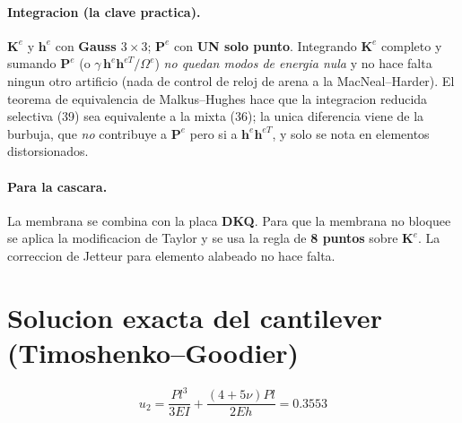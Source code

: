 \documentclass[11pt]{article}
\begin{document}
\paragraph{Integracion (la clave practica).}
$\mathbf K^{e}$ y $\mathbf h^{e}$ con \textbf{Gauss $3\times3$}; $\mathbf P^{e}$ con
\textbf{UN solo punto}. Integrando $\mathbf K^{e}$ completo y sumando $\mathbf P^{e}$
(o $\gamma\,\mathbf h^{e}\mathbf h^{eT}/\Omega^{e}$) \emph{no quedan modos de energia nula}
y no hace falta ningun otro artificio (nada de control de reloj de arena a la
MacNeal--Harder). El teorema de equivalencia de Malkus--Hughes hace que la integracion
reducida selectiva (39) sea equivalente a la mixta (36); la unica diferencia viene de la
burbuja, que \emph{no} contribuye a $\mathbf P^{e}$ pero si a
$\mathbf h^{e}\mathbf h^{eT}$, y solo se nota en elementos distorsionados.

\paragraph{Para la cascara.} La membrana se combina con la placa \textbf{DKQ}. Para que
la membrana no bloquee se aplica la modificacion de Taylor y se usa la regla de
\textbf{8 puntos} sobre $\mathbf K^{e}$. La correccion de Jetteur para elemento alabeado
no hace falta.

\section{Solucion exacta del cantilever (Timoshenko--Goodier)}
\begin{equation}
u_{2}=\frac{Pl^{3}}{3EI}+\frac{(4+5\nu)Pl}{2Eh}=0.3553
\tag{Fig.\,4}
\end{equation}
\end{document}
